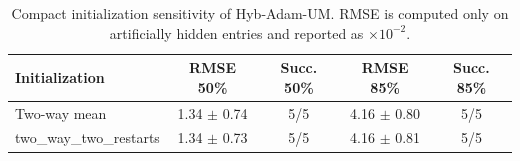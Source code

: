 \begin{table}[t]
\centering
\caption{Compact initialization sensitivity of Hyb-Adam-UM. RMSE is computed only on artificially hidden entries and reported as $\times 10^{-2}$.}
\label{tab:hyb_initialization_sensitivity_compact}
\small
\begin{tabular}{lcccc}
\toprule
Initialization & RMSE 50\% & Succ. 50\% & RMSE 85\% & Succ. 85\% \\
\midrule
Two-way mean & 1.34 $\pm$ 0.74 & 5/5 & 4.16 $\pm$ 0.80 & 5/5 \\
two\_way\_two\_restarts & 1.34 $\pm$ 0.73 & 5/5 & 4.16 $\pm$ 0.81 & 5/5 \\
\bottomrule
\end{tabular}
\end{table}
